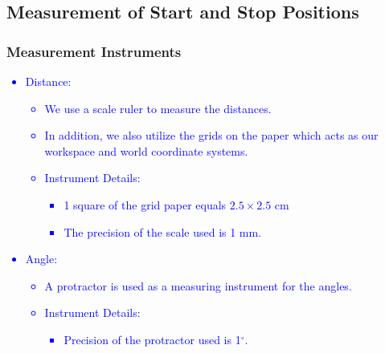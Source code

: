 \documentclass[10pt,a4paper]{article}
\begin{document}
			\subsection{Measurement of Start and Stop Positions}
				\subsubsection{Measurement Instruments}\textcolor{blue}{
					\begin{itemize}
						\item Distance:
						\begin{itemize}
							\item We use a scale ruler to measure the distances.
							\item In addition, we also utilize the grids on the paper which acts as our workspace and world coordinate systems.
							\item Instrument Details:
							\begin{itemize}
								\item 1 square of the grid paper equals $2.5 \times 2.5$ cm
								\item The precision of the scale used is 1 mm.
							\end{itemize}
						\end{itemize}
						\item Angle:
						\begin{itemize}
							\item A protractor is used as a measuring instrument for the angles.
							\item Instrument Details:
							\begin{itemize}
								\item Precision of the protractor used is 1$^\circ$.
							\end{itemize}
						\end{itemize}
					\end{itemize}
				}
\end{document}
